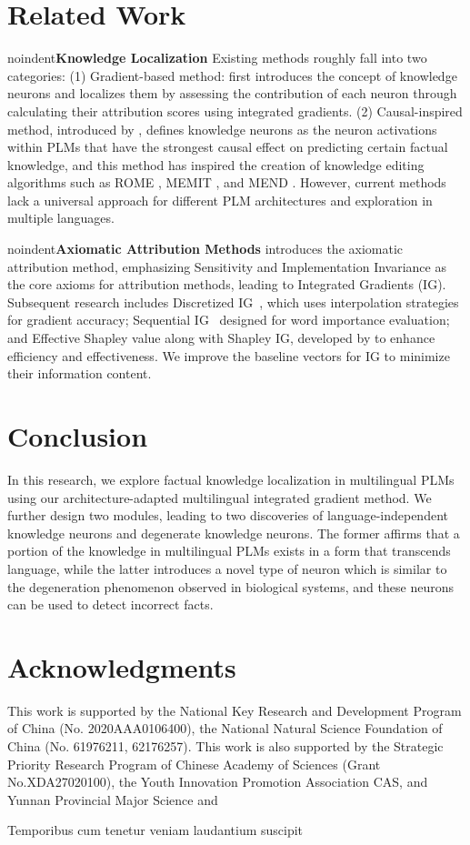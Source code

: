 \documentclass[]{article}
\newcommand{\vpara}[1]{noindent\textbf{#1 }}%
\begin{document}
\vspace{-1.00mm}
\section{Related Work}
\vpara{Knowledge Localization}
Existing methods roughly fall into two categories: (1) Gradient-based method: \citeauthor{dai2022kn} first introduces the concept of knowledge neurons and localizes them by assessing the contribution of each neuron \cite{key_value} through calculating their attribution scores using integrated gradients. (2) Causal-inspired method, introduced by \citeauthor{meng2022locating}, defines knowledge neurons as the neuron activations within PLMs that have the strongest causal effect on predicting certain factual knowledge, and this method has inspired the creation of knowledge editing algorithms such as ROME \cite{meng2022locating}, MEMIT \cite{meng2022memit}, and MEND \cite{mend}. However, current methods lack a universal approach for different PLM architectures and exploration in multiple languages.

\vpara{Axiomatic Attribution Methods}
\citeauthor{ig} introduces the axiomatic attribution method, emphasizing Sensitivity and Implementation Invariance as the core axioms for attribution methods, leading to Integrated Gradients (IG). Subsequent research includes Discretized IG~\cite{DIG}, which uses interpolation strategies for gradient accuracy; Sequential IG~\cite{enguehard2023sequential} designed for word importance evaluation; and Effective Shapley value along with Shapley IG, developed by \citeauthor{transparent} to enhance efficiency and effectiveness. We improve the baseline vectors for IG to minimize their information content.

\section{Conclusion}
In this research, we explore factual knowledge localization in multilingual PLMs using our architecture-adapted multilingual integrated gradient method. We further design two modules, leading to two discoveries of language-independent knowledge neurons and degenerate knowledge neurons. The former affirms that a portion of the knowledge in multilingual PLMs exists in a form that transcends language, while the latter introduces a novel type of neuron which is similar to the degeneration phenomenon observed in biological systems, and these neurons can be used to detect incorrect facts.

\section*{Acknowledgments}
This work is supported by the National Key Research and Development Program of China (No. 2020AAA0106400), the National Natural Science Foundation of China (No. 61976211, 62176257). This work is also supported by the Strategic Priority Research Program of Chinese Academy of Sciences (Grant No.XDA27020100), the Youth Innovation Promotion Association CAS, and Yunnan Provincial Major Science and

Temporibus cum tenetur veniam laudantium suscipit

\end{document}
